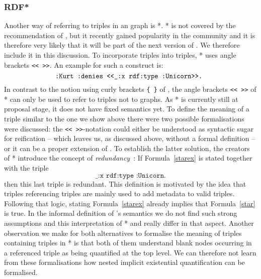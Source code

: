 \subsubsection{RDF*}
Another way of referring to \rdf triples in an \rdf graph is \rdf{}*\cite{rdfstar,rdfstarposter}. \rdf{}* is not covered by the \wwwc recommendation of \rdf, but it recently gained popularity in the community and 
it is therefore very likely that it will be part of the next version of \rdf. We therefore include it in this discussion.
To incorporate triples into triples, \rdf{}* uses angle brackets \texttt{<{}<  >{}>}. An example for such a construct is:
\begin{equation}\label{starex}
\verb!:Kurt :denies <<_:x rdf:type :Unicorn>>. !
\end{equation}
In contrast to the  notion using curly brackets \texttt{\{ \}} of \nthree, the angle brackets \texttt{<{}<  >{}>} of \rdf{}* can only be used to refer to triples not to graphs. 
As \rdf{}* is currently still at proposal stage, 
it does not have fixed semantics yet. To define the meaning of a triple similar to the one we show above there were two possible formalisations were discussed: the 
\texttt{<{}<  >{}>}-notation could either  be understood as syntactic sugar for reification -- which leaves us, as discussed above, without a formal 
definition -- or it can be a proper extension of \rdf. 
To establish the latter solution, the creators of \rdf{}*  introduce the concept of \emph{redundancy}~\cite{rdfstar}: If Formula~\ref{starex} is stated together with the \rdf triple
\begin{equation}\label{star}
 \texttt{\_:x rdf:type :Unicorn.}
\end{equation}
then this last triple is redundant. This definition is motivated by the idea that triples referencing triples are mainly used to add metadata to valid triples. 
Following that logic, stating Formula~\ref{starex} already implies that Formula~\ref{star} is true. In the informal definition of \nthree's semantics we do not find such strong assumptions 
and this interpretation of \rdf{}* and \nthree really differ in that aspect. Another observation we make for both alternatives to formalise 
the meaning of triples containing triples 
in \rdf{}* is that 
both of them understand blank nodes occurring in a referenced triple as being quantified at the top level. We can therefore not learn from these formalisations how nested implicit existential
quantification can be formalised.
